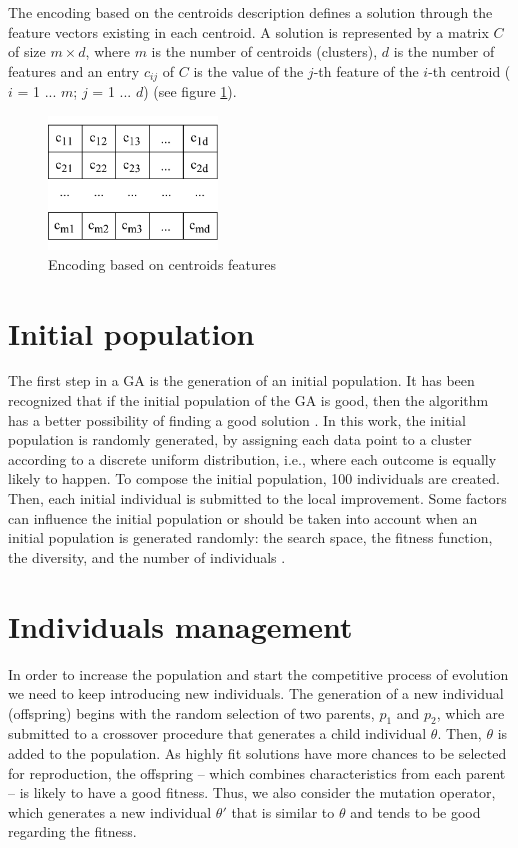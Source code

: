 The encoding based on the centroids description defines a solution through the feature vectors existing in each centroid. A solution is represented by a matrix $C$ of size $m \times d$, where $m$ is the number of centroids (clusters), $d$ is the number of features and an entry $c_{ij}$ of $C$ is the value of the $j$-th feature of the $i$-th centroid ($i$ = 1 ... $m$; $j$ = 1 ... $d$) (see figure \ref{fig:centroids-encoding}).

\begin{figure}[h]
  \begin{center}
    \includegraphics[width=0.4\textwidth]{img/centroids-encoding}
    \caption{Encoding based on centroids features}\label{fig:centroids-encoding}
  \end{center}
\end{figure}

\section{Initial population}
\label{sec:initial-population}
The first step in a GA is the generation of an initial population. It has been recognized that if the initial population of the GA is good, then the algorithm has a better possibility of finding a good solution \cite{Burke2004, Zitzler2000}. In this work, the initial population is randomly generated, by assigning each data point to a cluster according to a discrete uniform distribution, i.e., where each outcome is equally likely to happen. To compose the initial population, 100 individuals are created. Then, each initial individual is submitted to the local improvement. Some factors can influence the initial population or should be taken into account when an initial population is generated randomly: the search space, the fitness function, the diversity, and the number of individuals \cite{DiazGomez2007}.

\section{Individuals management}
\label{individuals-management}
In order to increase the population and start the competitive process of evolution we need to keep introducing new individuals. The generation of a new individual (offspring) begins with the random selection of two parents, $p_1$ and $p_2$, which are submitted to a crossover procedure that generates a child individual $\theta$. Then, $\theta$ is added to the population. As highly fit solutions have more chances to be selected for reproduction, the offspring -- which combines characteristics from each parent -- is likely to have a good fitness. Thus, we also consider the mutation operator, which generates a new individual $\theta'$ that is similar to $\theta$ and tends to be good regarding the fitness.

